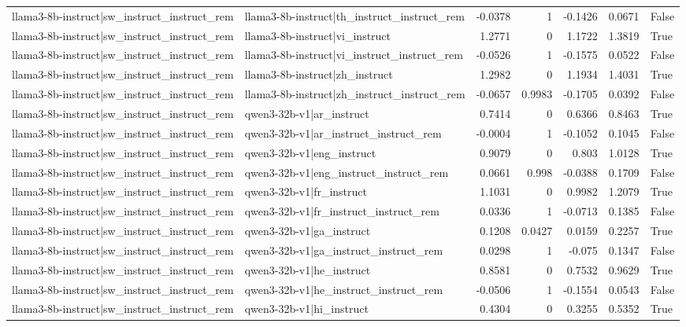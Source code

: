 \begin{table}
\begin{tabular}{l l r r r r l}
llama3-8b-instruct|sw_instruct_instruct_rem & llama3-8b-instruct|th_instruct_instruct_rem & -0.0378 & 1 & -0.1426 & 0.0671 & False \\
llama3-8b-instruct|sw_instruct_instruct_rem & llama3-8b-instruct|vi_instruct & 1.2771 & 0 & 1.1722 & 1.3819 & True \\
llama3-8b-instruct|sw_instruct_instruct_rem & llama3-8b-instruct|vi_instruct_instruct_rem & -0.0526 & 1 & -0.1575 & 0.0522 & False \\
llama3-8b-instruct|sw_instruct_instruct_rem & llama3-8b-instruct|zh_instruct & 1.2982 & 0 & 1.1934 & 1.4031 & True \\
llama3-8b-instruct|sw_instruct_instruct_rem & llama3-8b-instruct|zh_instruct_instruct_rem & -0.0657 & 0.9983 & -0.1705 & 0.0392 & False \\
llama3-8b-instruct|sw_instruct_instruct_rem & qwen3-32b-v1|ar_instruct & 0.7414 & 0 & 0.6366 & 0.8463 & True \\
llama3-8b-instruct|sw_instruct_instruct_rem & qwen3-32b-v1|ar_instruct_instruct_rem & -0.0004 & 1 & -0.1052 & 0.1045 & False \\
llama3-8b-instruct|sw_instruct_instruct_rem & qwen3-32b-v1|eng_instruct & 0.9079 & 0 & 0.803 & 1.0128 & True \\
llama3-8b-instruct|sw_instruct_instruct_rem & qwen3-32b-v1|eng_instruct_instruct_rem & 0.0661 & 0.998 & -0.0388 & 0.1709 & False \\
llama3-8b-instruct|sw_instruct_instruct_rem & qwen3-32b-v1|fr_instruct & 1.1031 & 0 & 0.9982 & 1.2079 & True \\
llama3-8b-instruct|sw_instruct_instruct_rem & qwen3-32b-v1|fr_instruct_instruct_rem & 0.0336 & 1 & -0.0713 & 0.1385 & False \\
llama3-8b-instruct|sw_instruct_instruct_rem & qwen3-32b-v1|ga_instruct & 0.1208 & 0.0427 & 0.0159 & 0.2257 & True \\
llama3-8b-instruct|sw_instruct_instruct_rem & qwen3-32b-v1|ga_instruct_instruct_rem & 0.0298 & 1 & -0.075 & 0.1347 & False \\
llama3-8b-instruct|sw_instruct_instruct_rem & qwen3-32b-v1|he_instruct & 0.8581 & 0 & 0.7532 & 0.9629 & True \\
llama3-8b-instruct|sw_instruct_instruct_rem & qwen3-32b-v1|he_instruct_instruct_rem & -0.0506 & 1 & -0.1554 & 0.0543 & False \\
llama3-8b-instruct|sw_instruct_instruct_rem & qwen3-32b-v1|hi_instruct & 0.4304 & 0 & 0.3255 & 0.5352 & True \\

\end{tabular}
\end{table}
